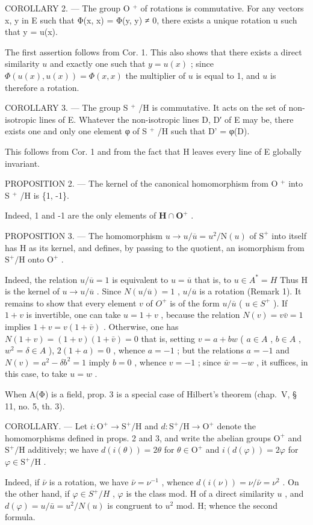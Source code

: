 COROLLARY 2. --- The group O \(^{+}\) of rotations is commutative. For any vectors x, y in E such that Φ(x, x) = Φ(y, y) ≠ 0, there exists a unique rotation u such that y = u(x).

The first assertion follows from Cor. 1. This also shows that there exists a direct similarity \(u\) and exactly one such that \(y = u(x)\) ; since \(\Phi(u(x), u(x)) = \Phi(x, x)\) the multiplier of \(u\) is equal to 1, and \(u\) is therefore a rotation.

COROLLARY 3. --- The group S \(^{+}\) /H is commutative. It acts on the set of non-isotropic lines of E. Whatever the non-isotropic lines D, D′ of E may be, there exists one and only one element φ of S \(^{+}\) /H such that D' = φ(D).

This follows from Cor. 1 and from the fact that H leaves every line of E globally invariant.

PROPOSITION 2. --- The kernel of the canonical homomorphism from O \(^{+}\) into S \(^{+}\) /H is \{1, -1\}.

Indeed, 1 and -1 are the only elements of \(\mathbf{H} \cap \mathbf{O}^{+}\) .

PROPOSITION 3. --- The homomorphism \(u \to u/\overline{u} = u^{2}/\mathrm{N}(u)\) of \(\mathrm{S}^{+}\) into itself has H as its kernel, and defines, by passing to the quotient, an isomorphism from \(\mathrm{S}^{+}/\mathrm{H}\) onto \(\mathrm{O}^{+}\) .

Indeed, the relation \(u/\overline{u} = 1\) is equivalent to \(u = \overline{u}\) that is, to \(u \in A^* = H\) Thus H is the kernel of \(u \to u/\overline{u}\) . Since \(N(u/\overline{u}) = 1\) , \(u/\overline{u}\) is a rotation (Remark 1). It remains to show that every element \(v\) of \(O^+\) is of the form \(u/\overline{u}\) ( \(u \in S^+\) ). If \(1 + v\) is invertible, one can take \(u = 1 + v\) , because the relation \(N(v) = v\bar{v} = 1\) implies \(1 + v = v(1 + \bar{v})\) . Otherwise, one has \(N(1 + v) = (1 + v)(1 + \bar{v}) = 0\) that is, setting \(v = a + bw\) ( \(a \in A\) , \(b \in A\) , \(w^2 = \delta \in A\) ), \(2(1 + a) = 0\) , whence \(a = -1\) ; but the relations \(a = -1\) and \(N(v) = a^2 - \delta b^2 = 1\) imply \(b = 0\) , whence \(v = -1\) ; since \(\bar{w} = -w\) , it suffices, in this case, to take \(u = w\) .

When A(Φ) is a field, prop. 3 is a special case of Hilbert's theorem (chap.~V, § 11, no. 5, th. 3).

COROLLARY. — Let \(i: \mathrm{O}^{+} \to \mathrm{S}^{+}/\mathrm{H}\) and \(d: \mathrm{S}^{+}/\mathrm{H} \to \mathrm{O}^{+}\) denote the homomorphisms defined in props. 2 and 3, and write the abelian groups \(\mathrm{O}^{+}\) and \(\mathrm{S}^{+}/\mathrm{H}\) additively; we have \(d(i(\theta)) = 2\theta\) for \(\theta \in \mathrm{O}^{+}\) and \(i(d(\varphi)) = 2\varphi\) for \(\varphi \in \mathrm{S}^{+}/\mathrm{H}\) .

Indeed, if \(\bar{\nu}\) is a rotation, we have \(\bar{\nu} = \nu^{-1}\) , whence \(d(i(\nu)) = \nu/\bar{\nu} = \nu^{2}\) . On the other hand, if \(\varphi \in S^{+}/H\) , \(\varphi\) is the class mod. H of a direct similarity \(u\) , and \(d(\varphi) = u/\bar{u} = u^{2}/N(u)\) is congruent to \(u^{2}\) mod. H; whence the second formula.


